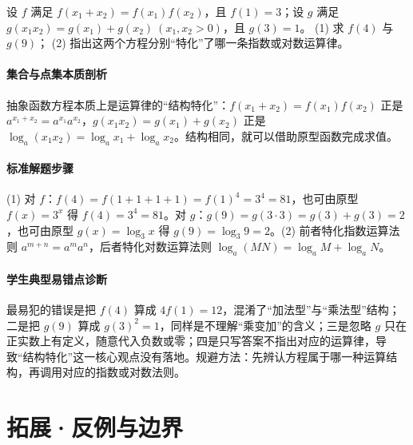 \begin{problem}
设 $f$ 满足 $f(x_1+x_2)=f(x_1)f(x_2)$，且 $f(1)=3$；设 $g$ 满足 $g(x_1x_2)=g(x_1)+g(x_2)\ (x_1,x_2>0)$，且 $g(3)=1$。
(1) 求 $f(4)$ 与 $g(9)$；
(2) 指出这两个方程分别“特化”了哪一条指数或对数运算律。
\end{problem}
\begin{solution}
\paragraph{集合与点集本质剖析}
抽象函数方程本质上是运算律的“结构特化”：$f(x_1+x_2)=f(x_1)f(x_2)$ 正是 $a^{x_1+x_2}=a^{x_1}a^{x_2}$，$g(x_1x_2)=g(x_1)+g(x_2)$ 正是 $\log_a(x_1x_2)=\log_a x_1+\log_a x_2$。结构相同，就可以借助原型函数完成求值。
\paragraph{标准解题步骤}
(1) 对 $f$：$f(4)=f(1+1+1+1)=f(1)^4=3^4=81$，也可由原型 $f(x)=3^x$ 得 $f(4)=3^4=81$。对 $g$：$g(9)=g(3\cdot3)=g(3)+g(3)=2$，也可由原型 $g(x)=\log_3 x$ 得 $g(9)=\log_3 9=2$。(2) 前者特化指数运算法则 $a^{m+n}=a^m a^n$，后者特化对数运算法则 $\log_a(MN)=\log_a M+\log_a N$。
\paragraph{学生典型易错点诊断}
最易犯的错误是把 $f(4)$ 算成 $4f(1)=12$，混淆了“加法型”与“乘法型”结构；二是把 $g(9)$ 算成 $g(3)^2=1$，同样是不理解“乘变加”的含义；三是忽略 $g$ 只在正实数上有定义，随意代入负数或零；四是只写答案不指出对应的运算律，导致“结构特化”这一核心观点没有落地。规避方法：先辨认方程属于哪一种运算结构，再调用对应的指数或对数法则。
\end{solution}

\section{拓展·反例与边界}

